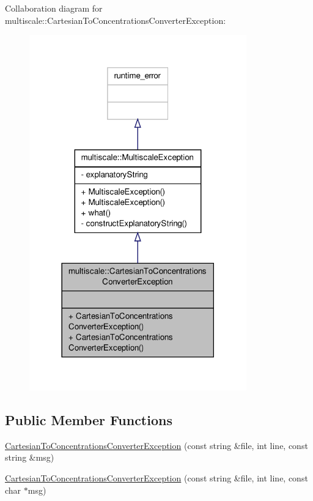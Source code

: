 Collaboration diagram for multiscale\-:\-:Cartesian\-To\-Concentrations\-Converter\-Exception\-:\nopagebreak
\begin{figure}[H]
\begin{center}
\leavevmode
\includegraphics[width=266pt]{classmultiscale_1_1CartesianToConcentrationsConverterException__coll__graph}
\end{center}
\end{figure}
\subsection*{Public Member Functions}
\begin{DoxyCompactItemize}
\item 
\hyperlink{classmultiscale_1_1CartesianToConcentrationsConverterException_a1c307db0f880fb689b2f777e1d0bee89}{Cartesian\-To\-Concentrations\-Converter\-Exception} (const string \&file, int line, const string \&msg)
\item 
\hyperlink{classmultiscale_1_1CartesianToConcentrationsConverterException_a8d14e1f35af551c85fecc398f34cd125}{Cartesian\-To\-Concentrations\-Converter\-Exception} (const string \&file, int line, const char $\ast$msg)
\end{DoxyCompactItemize}


